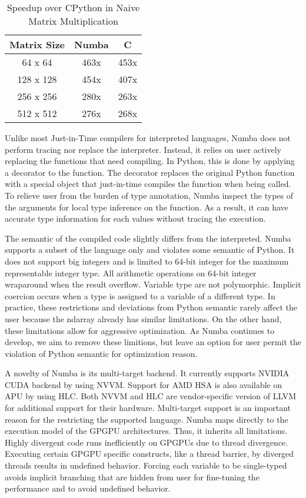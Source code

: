 \documentclass{acm_proc_article-sp}
\begin{document}
\begin{table}
\centering
\caption{Speedup over CPython in Naive Matrix Multiplication}
\label{table:speedup}
\begin{tabular}{|c|c|c|} \hline
\textbf{Matrix Size} & \textbf{Numba} & \textbf{C}\\ \hline
64 x 64 & 463x & 453x \\ \hline
128 x 128 & 454x & 407x \\ \hline
256 x 256 & 280x & 263x \\ \hline
512 x 512 & 276x & 268x \\ \hline
\end{tabular}
\end{table}



Unlike most Just-in-Time compilers for interpreted languages, Numba does not
perform tracing nor replace the interpreter.
Instead, it relies on user actively replacing the functions that need compiling.
In Python, this is done by applying a decorator to the function.
The decorator replaces the original Python function with a special object
that just-in-time compiles the function when being called.
To relieve user from the burden of type annotation, Numba inspect the types
of the arguments for local type inference on the function.
As a result, it can have accurate type information for each values without
tracing the execution.

The semantic of the compiled code slightly differs
from the interpreted. Numba supports a subset of the language only
and violates some semantic of Python.  It does not support big integers
and is limited to 64-bit integer for the maximum representable integer type.
All arithmetic operations on 64-bit integer wraparound when the result
overflow.  Variable type are not polymorphic.  Implicit coercion occurs when
a type is assigned to a variable of a different type. In practice, these
restrictions and deviations from Python semantic rarely affect the user
because the ndarray already has similar limitations. On the other hand, these
limitations allow for aggressive optimization.  As Numba continues to develop,
we aim to remove these limitions, but leave an option for user permit the
violation of Python semantic for optimization reason.

A novelty of Numba is its multi-target backend.  It currently supports NVIDIA
CUDA backend by using NVVM.  Support for AMD HSA is also available on APU by
using HLC.  Both NVVM and HLC are vendor-specific version of LLVM for
additional support for their hardware.  Multi-target support is an important
reason for the restricting the supported language.
Numba maps directly to the execution model of the GPGPU architectures.
Thus, it inherits all limitations.
Highly divergent code runs inefficiently on GPGPUs due to thread divergence.
Executing certain GPGPU specific constructs, like a thread barrier, by diverged
threads results in undefined behavior. Forcing each variable to be single-typed
avoids implicit branching that are hidden from user for fine-tuning the
performance and to avoid undefined behavior.
\end{document}
